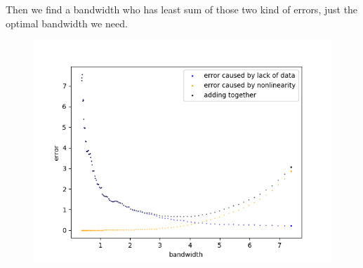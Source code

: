 \documentclass[a4 paper,12pt]{article}
\begin{document}
Then we find a bandwidth who has least sum of those two kind of errors, just the optimal bandwidth we need.

\begin{figure}[h]
	\centering
	\includegraphics[scale=1]{Figure_5.png}
\end{figure}
\end{document}
